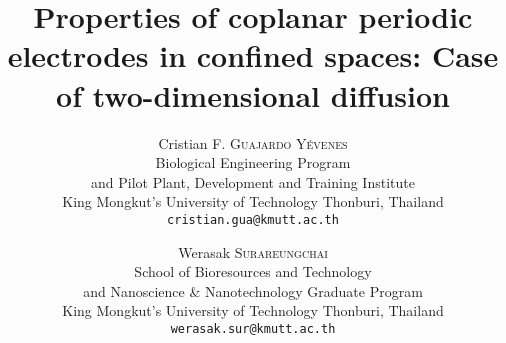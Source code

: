 \documentclass[a4paper,11pt]{article}
\begin{document}

\newcommand{\citex}[2]{\cite[\expandafter{#1}]{#2}}  %
\newcommand{\dlmf}[3][]{\href{http://dlmf.nist.gov/#2#1#3}{#2#3}}
\newcommand{\wikipedia}[2][en]{\href{http://#1.wikipedia.org/wiki/#2}{#2}}
\newcommand{\elektrodo}{https://gitlab.com/cfgy/elektrodo/tree/publ-2018jan}

\newcommand{\fourier}{\operatorname{\mathcal{F}}_{x}}
\newcommand{\laplace}{\operatorname{\mathcal{L}}_{t}}
\newcommand{\ud}[1]{\,\mathrm{d}#1}

\newcommand{\e}{\operatorname{e}}

\newcommand{\flechadoble}{\ce{<=>}}
\newcommand{\deriv}[2]{\frac{\ud #1}{\ud #2}}
\newcommand{\parderiv}[2]{\frac{\partial #1}{\partial #2}}
\newcommand{\simu}{_{\mathrm{sim}}}
\newcommand{\unit}{^{\text{unit}}}
\newcommand{\whole}{^{\text{whole}}}

\newtheorem{observacion}{Remark}[section]
\newtheorem{definicion}{Definition}[section]
\newtheorem{lema}{Lemma}[section]
\newtheorem{teorema}{Theorem}[section]
\newtheorem{corolario}{Corollary}[section]

\renewcommand{\qedsymbol}{\textit{QED}.}



\newcommand{\givennames}[1]{#1}
\newcommand{\familynames}[1]{\textsc{#1}}

\title{
	Properties of coplanar periodic electrodes in confined spaces:
	Case of two-dimensional diffusion
}

\author{
	\givennames{Cristian F.} \familynames{Guajardo Yévenes} \\
	Biological Engineering Program \\
	and Pilot Plant, Development and Training Institute \\
	King Mongkut's University of Technology Thonburi, Thailand \\
	\texttt{cristian.gua@kmutt.ac.th}
	\and
	\givennames{Werasak} \familynames{Surareungchai} \\
	School of Bioresources and Technology \\
	and Nanoscience \& Nanotechnology Graduate Program \\
	King Mongkut's University of Technology Thonburi, Thailand \\
	\texttt{werasak.sur@kmutt.ac.th}
}
\end{document}

